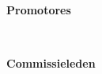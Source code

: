 \thispagestyle{empty}
\noindent \textbf{Promotores} \par
\noindent \coadvisorOne \\ 
\noindent \coadvisorTwo \par

\bigbreak

\noindent \textbf{Commissieleden} \par
\noindent \committeeOne \\ 
\noindent \committeeTwo \\ 
\noindent \committeeThree \\ 
\noindent \committeeFour \\ 
\noindent \committeeFive \par
\noindent \clearpage